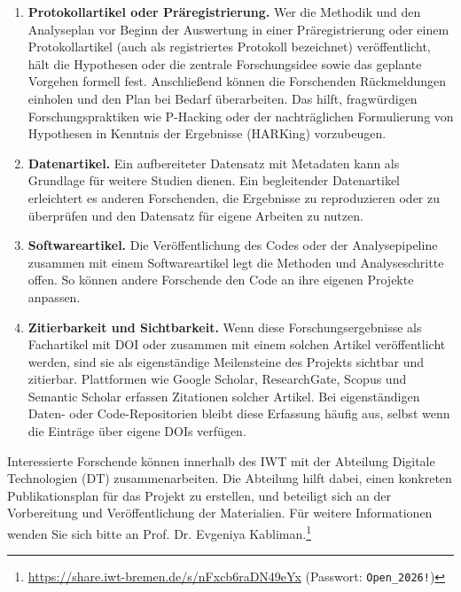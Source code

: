 \begin{enumerate}
	\item \textbf{Protokollartikel oder Präregistrierung.} Wer die Methodik und den
	Analyseplan vor Beginn der Auswertung in einer Präregistrierung oder einem
	Protokollartikel (auch als registriertes Protokoll bezeichnet) veröffentlicht,
	hält die Hypothesen oder die zentrale Forschungsidee sowie das geplante Vorgehen
	formell fest. Anschließend können die Forschenden Rückmeldungen einholen und
	den Plan bei Bedarf überarbeiten. Das hilft, fragwürdigen Forschungspraktiken
	wie P-Hacking oder der nachträglichen Formulierung von Hypothesen in Kenntnis
	der Ergebnisse (HARKing) vorzubeugen.
	
	\item \textbf{Datenartikel.} Ein aufbereiteter Datensatz mit Metadaten kann als
	Grundlage für weitere Studien dienen. Ein begleitender Datenartikel erleichtert
	es anderen Forschenden, die Ergebnisse zu reproduzieren oder zu überprüfen und
	den Datensatz für eigene Arbeiten zu nutzen.
	
	\item \textbf{Softwareartikel.} Die Veröffentlichung des Codes oder der
	Analysepipeline zusammen mit einem Softwareartikel legt die Methoden und
	Analyseschritte offen. So können andere Forschende den Code an ihre eigenen
	Projekte anpassen.
	
	\item \textbf{Zitierbarkeit und Sichtbarkeit.} Wenn diese Forschungsergebnisse
	als Fachartikel mit DOI oder zusammen mit einem solchen Artikel veröffentlicht
	werden, sind sie als eigenständige Meilensteine des Projekts sichtbar und
	zitierbar. Plattformen wie Google Scholar, ResearchGate, Scopus und Semantic
	Scholar erfassen Zitationen solcher Artikel. Bei eigenständigen Daten- oder
	Code-Repositorien bleibt diese Erfassung häufig aus, selbst wenn die Einträge
	über eigene DOIs verfügen.
\end{enumerate}

Interessierte Forschende können innerhalb des IWT mit der Abteilung Digitale
Technologien (DT) zusammenarbeiten. Die Abteilung hilft dabei, einen konkreten
Publikationsplan für das Projekt zu erstellen, und beteiligt sich an der Vorbereitung
und Veröffentlichung der Materialien. Für weitere Informationen wenden Sie sich bitte
an Prof. Dr. Evgeniya Kabliman.\footnote{%
	\url{https://share.iwt-bremen.de/s/nFxcb6raDN49eYx}
	(Passwort: \texttt{Open\_2026!})}

